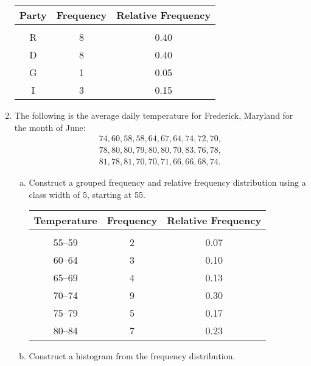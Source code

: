 \begin{enumerate}
\begin{center}
\begin{tabular}{c c c}
\textbf{Party} & \textbf{Frequency} & \textbf{Relative Frequency}\\
\hline
& & \\
R & 8 & 0.40\\
D & 8 & 0.40\\
G & 1 & 0.05\\
I & 3 & 0.15
\end{tabular}
\end{center}

\item The following is the average daily temperature for Frederick, Maryland for the month of June: \begin{align*}74, 60, 58, 58, 64, 67, 64, 74, 72, 70,\\ 78, 80, 80, 79, 80, 80, 70, 83, 76, 78,\\ 81, 78, 81, 70, 70, 71, 66, 66, 68, 74.\end{align*}
\begin{enumerate}[(a)]
\item Construct a grouped frequency and relative frequency distribution using a class width of 5, starting at 55.

\begin{center}
\begin{tabular}{c c c}
\textbf{Temperature} & \textbf{Frequency} & \textbf{Relative Frequency}\\
\hline
& & \\
55--59 & 2 & 0.07\\
60--64 & 3 & 0.10\\
65--69 & 4 & 0.13\\
70--74 & 9 & 0.30\\
75--79 & 5 & 0.17\\
80--84 & 7 & 0.23
\end{tabular}
\end{center}

\item Construct a histogram from the frequency distribution. 

\begin{center}
\end{center}


\end{enumerate}
\end{enumerate}
